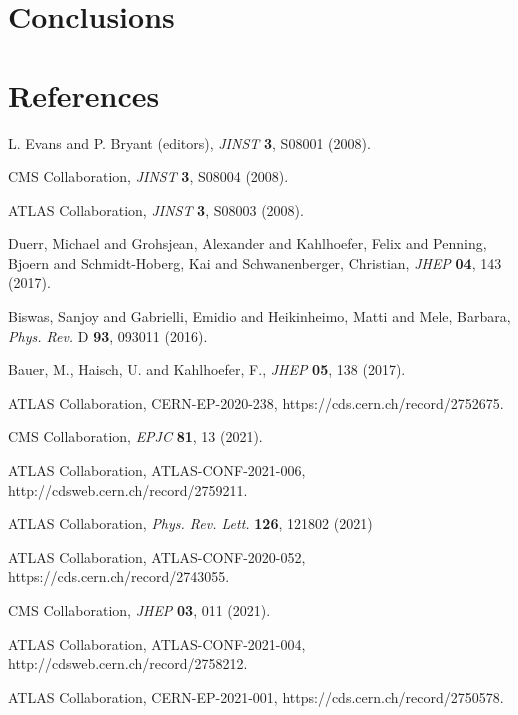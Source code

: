 \documentclass{moriond}
\def\Journal#1#2#3#4{{#1} {\bf #2}, #3 (#4)}
\def\PRL{\em Phys. Rev. Lett.}
\def\PRD{{\em Phys. Rev.} D}
\def\JINST{\em JINST}
\def\JHEP{\em JHEP}
\def\EPJC{\em EPJC}
\begin{document}
\section{Conclusions}



\section*{References}

\begin{thebibliography}{99}

L. Evans and P. Bryant (editors), \Journal{\JINST}{3}{S08001}{2008}.

CMS Collaboration, \Journal{\JINST}{3}{S08004}{2008}.

ATLAS Collaboration, \Journal{\JINST}{3}{S08003}{2008}.

Duerr, Michael and Grohsjean, Alexander and Kahlhoefer, Felix and Penning, Bjoern and Schmidt-Hoberg, Kai and Schwanenberger, Christian, \Journal{\JHEP}{04}{143}{2017}.

Biswas, Sanjoy and Gabrielli, Emidio and Heikinheimo, Matti and Mele, Barbara, \Journal{\PRD}{93}{093011}{2016}.

Bauer, M., Haisch, U. and Kahlhoefer, F., \Journal{\JHEP}{05}{138}{2017}.

ATLAS Collaboration, CERN-EP-2020-238, https://cds.cern.ch/record/2752675.

CMS Collaboration, \Journal{\EPJC}{81}{13}{2021}.

ATLAS Collaboration, ATLAS-CONF-2021-006, http://cdsweb.cern.ch/record/2759211. 

ATLAS Collaboration, \Journal{\PRL}{126}{121802}{2021} 

ATLAS Collaboration, ATLAS-CONF-2020-052, https://cds.cern.ch/record/2743055.

CMS Collaboration, \Journal{\JHEP}{03}{011}{2021}.

ATLAS Collaboration, ATLAS-CONF-2021-004, http://cdsweb.cern.ch/record/2758212.

ATLAS Collaboration, CERN-EP-2021-001, https://cds.cern.ch/record/2750578.

\end{thebibliography}
\end{document}
